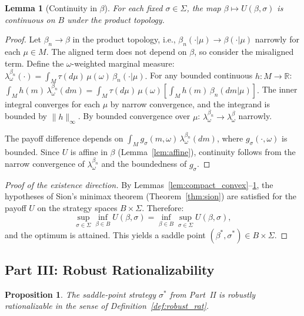 \documentclass[11pt,a4paper]{article}
\newtheorem{lemma}[theorem]{Lemma}
\newtheorem{proposition}[theorem]{Proposition}
\theoremstyle{definition}
\newcommand{\R}{\mathbb{R}}
\begin{document}
\begin{lemma}[Continuity in $\beta$]
\label{lem:cont_beta}
For each fixed $\sigma\in\Sigma$, the map $\beta\mapsto U(\beta,\sigma)$ is continuous on $B$ under the product topology.
\end{lemma}

\begin{proof}
Let $\beta_n\to\beta$ in the product topology, i.e., $\beta_n(\cdot|\mu)\to\beta(\cdot|\mu)$ narrowly for each $\mu\in M$.
The aligned term does not depend on $\beta$, so consider the misaligned term.
Define the $\omega$-weighted marginal measure:
$\lambda_\omega^{\beta_n}(\cdot) = \int_M\tau(d\mu)\,\mu(\omega)\,\beta_n(\cdot|\mu).$
For any bounded continuous $h:M\to\R$:
$\int_M h(m)\,\lambda_\omega^{\beta_n}(dm) = \int_M\tau(d\mu)\,\mu(\omega)\left[\int_M h(m)\,\beta_n(dm|\mu)\right].$
The inner integral converges for each $\mu$ by narrow convergence, and the integrand is bounded by $\|h\|_\infty$.
By bounded convergence over $\mu$:
$\lambda_\omega^{\beta_n}\to\lambda_\omega^\beta$ narrowly.

The payoff difference depends on $\int_M g_\sigma(m,\omega)\,\lambda_\omega^{\beta_n}(dm)$, where $g_\sigma(\cdot,\omega)$ is bounded.
Since $U$ is affine in $\beta$ (Lemma~\ref{lem:affine}), continuity follows from the narrow convergence of $\lambda_\omega^{\beta_n}$ and the boundedness of $g_\sigma$.
\end{proof}

\begin{proof}[Proof of the existence direction]
By Lemmas~\ref{lem:compact_convex}--\ref{lem:cont_beta}, the hypotheses of Sion's minimax theorem (Theorem~\ref{thm:sion}) are satisfied for the payoff $U$ on the strategy spaces $B\times\Sigma$.
Therefore:
\begin{equation}
\sup_{\sigma\in\Sigma}\inf_{\beta\in B} U(\beta,\sigma)
= \inf_{\beta\in B}\sup_{\sigma\in\Sigma} U(\beta,\sigma),
\end{equation}
and the optimum is attained.
This yields a saddle point $(\beta^*,\sigma^*)\in B\times\Sigma$.
\end{proof}

\subsection{Part III: Robust Rationalizability}
\label{sec:robust_rat}

\begin{proposition}
\label{prop:rr}
The saddle-point strategy $\sigma^*$ from Part~II is robustly rationalizable in the sense of Definition~\ref{def:robust_rat}.
\end{proposition}
\end{document}
